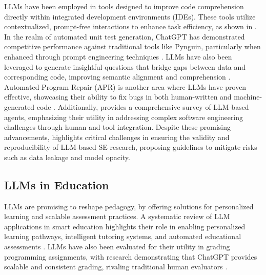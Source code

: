 
LLMs have been employed in tools designed to improve code comprehension directly within integrated development environments (IDEs). These tools utilize contextualized, prompt-free interactions to enhance task efficiency, as shown in \cite{3597503.3639187}.  
In the realm of automated unit test generation, ChatGPT has demonstrated competitive performance against traditional tools like Pynguin, particularly when enhanced through prompt engineering techniques \cite{llm4code38}.  
LLMs have also been leveraged to generate insightful questions that bridge gaps between data and corresponding code, improving semantic alignment and comprehension \cite{llm4code21}.  
Automated Program Repair (APR) is another area where LLMs have proven effective, showcasing their ability to fix bugs in both human-written and machine-generated code \cite{10172854}.  
Additionally, \cite{2409.02977} provides a comprehensive survey of LLM-based agents, emphasizing their utility in addressing complex software engineering challenges through human and tool integration.
Despite these promising advancements, \cite{3639476.3639764} highlights critical challenges in ensuring the validity and reproducibility of LLM-based SE research, proposing guidelines to mitigate risks such as data leakage and model opacity.  


\subsection{LLMs in Education}
LLMs are promising to reshape pedagogy, by offering solutions for personalized learning and scalable assessment practices. A systematic review of LLM applications in smart education highlights their role in enabling personalized learning pathways, intelligent tutoring systems, and automated educational assessments \cite{2311.13160}. LLMs have also been evaluated for their utility in grading programming assignments, with research demonstrating that ChatGPT provides scalable and consistent grading, rivaling traditional human evaluators \cite{llm4code5}.







